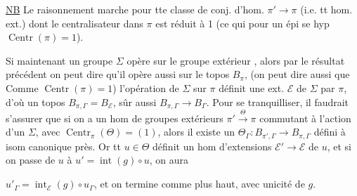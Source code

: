 \uline{NB} Le raisonnement marche pour tte classe
de conj. d'hom.  \(\pi'\longrightarrow\pi\) (i.e. tt hom.
ext.) dont le centralisateur dans \(\pi\) est
réduit à 1 (ce qui pour un épi se
hyp \(\operatorname{Centr}(\pi)=1\)).

Si maintenant un groupe \(\Sigma\) opère
sur le groupe extérieur \inserted{\(\pi\)}, alors par le
résultat précédent on peut dire qu'il
opère aussi sur le topos \(B_\pi\),  (on peut
dire aussi que  Comme
\(\operatorname{Centr}(\pi)=1\)) l'opération de \deleted{\(\unsure{\pi}\)}\(\Sigma\) sur \(\pi\)
définit une ext. \(\mathcal E\) de \(\Sigma\) par \(\pi\),
d'où un topos \(B_{\pi,\Gamma}=B_{\mathcal E}\),   
sûr aussi \(B_{\pi,\Gamma}\longrightarrow B_{\Gamma}\). Pour se
tranquilliser, il faudrait s'assurer que
si on a un hom de groupes extérieurs
\(\pi'\xrightarrow{\Theta}\pi\) commutant à l'action d'un
\(\Sigma\), avec \(\operatorname{Centr}_\pi(\Theta)=(1)\), alors il existe
un \(\Theta_{\Gamma}:B_{\pi',\Gamma}\longrightarrow B_{\pi,\Gamma}\) défini à isom
canonique près. Or tt \(u\in\Theta\) définit un
hom d'extensions 
\(\mathcal E'\longrightarrow\mathcal E\)  de
\(u\), et si on passe de \(u\) à \(u'=\operatorname{int}(g)\circ u\), on aura

\(u'_{\Gamma}=\operatorname{int}_{\mathcal E}(g)\circ u_{\Gamma}\), et on termine comme
plus haut, avec unicité de \(g\).

